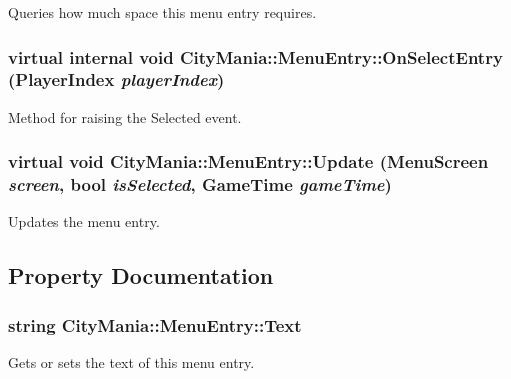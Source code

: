 Queries how much space this menu entry requires. \hypertarget{classCityMania_1_1MenuEntry_ab163a7cb2a760af1007a923cd2bc87ed}{
\subsubsection[{OnSelectEntry}]{\setlength{\rightskip}{0pt plus 5cm}virtual internal void CityMania::MenuEntry::OnSelectEntry (PlayerIndex {\em playerIndex})}}
\label{classCityMania_1_1MenuEntry_ab163a7cb2a760af1007a923cd2bc87ed}


Method for raising the Selected event. \hypertarget{classCityMania_1_1MenuEntry_a0e1a13e81f7c27a116122ca5d59b3858}{
\subsubsection[{Update}]{\setlength{\rightskip}{0pt plus 5cm}virtual void CityMania::MenuEntry::Update ({\bf MenuScreen} {\em screen}, \/  bool {\em isSelected}, \/  GameTime {\em gameTime})}}
\label{classCityMania_1_1MenuEntry_a0e1a13e81f7c27a116122ca5d59b3858}


Updates the menu entry. 

\subsection{Property Documentation}
\hypertarget{classCityMania_1_1MenuEntry_a9acc56b2750d90a7c5c3f190367b803e}{
\subsubsection[{Text}]{\setlength{\rightskip}{0pt plus 5cm}string CityMania::MenuEntry::Text}}
\label{classCityMania_1_1MenuEntry_a9acc56b2750d90a7c5c3f190367b803e}


Gets or sets the text of this menu entry. 

